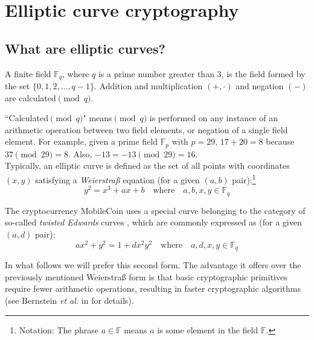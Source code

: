 \section{Elliptic curve cryptography}
\label{sec:EllipticCurveCryptography}


\subsection{What are elliptic curves?}
\label{subsec:elliptic_curves_section}

A finite field \(\mathbb{F}_q\), where \(q\) is a prime number greater than 3, is the field formed by the set \(\{0, 1, 2, ..., q-1\}\). Addition and multiplication \((+,  \cdot)\) and negation $(-)$ are calculated\( \pmod q\).

``Calculated\( \pmod q\)" means\( \pmod q\) is performed on any instance of an arithmetic operation between two field elements, or negation of a single field element. For example, given a prime field \(\mathbb{F}_p\) with $p = 29$, $17+20=8$ because $37 \pmod{29} = 8$. Also, $-13 = -13 \pmod{29} = 16$.\\

Typically, an elliptic curve is defined as the set of all points with coordinates \((x, y)\) satisfying a {\em Weierstraß} equation \cite{Hankerson:2003:GEC:940321} (for a given $(a,b)$ pair):\footnote{\label{notation1}Notation: The phrase $a \in \mathbb{F}$ means $a$ is some element in the field $\mathbb{F}$.}\vspace{.175cm}
\[y^2 = x^3 + a x + b \quad \textrm{where} \quad a, b, x, y \in \mathbb{F}_q\]

The cryptocurrency MobileCoin uses a special curve belonging to the category of so-called {\em twisted Edwards} curves \cite{Bernstein2008-twisted-edwards}, which are commonly expressed as (for a given $(a,d)$ pair):\vspace{.175cm}
\[a x^2 + y^2 = 1 + d x^2 y^2 \quad \textrm{where} \quad a, d, x, y \in \mathbb{F}_q \]

In what follows we will prefer this second form. The advantage it offers over the previously mentioned Weierstraß form is that basic cryptographic primitives require fewer arithmetic operations, resulting in faster cryptographic algorithms (see Bernstein {\em et al.} in \cite{Bernstein2007-faster-ec-ops} for details).\\

